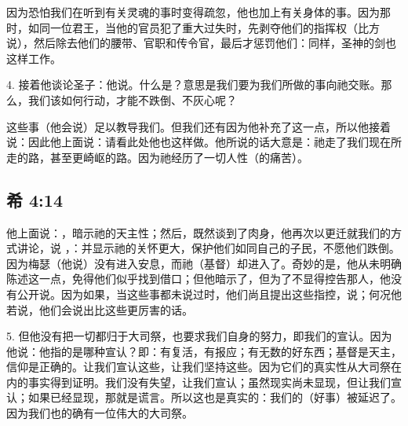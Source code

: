 因为恐怕我们在听到有关灵魂的事时变得疏忽，他也加上有关身体的事。因为那时，如同一位君王，当他的官员犯了重大过失时，先剥夺他们的指挥权（比方说），然后除去他们的腰带、官职和传令官，最后才惩罚他们：同样，圣神的剑也这样工作。\par

4. 接着他谈论圣子：他说。什么是？意思是我们要为我们所做的事向祂交账。那么，我们该如何行动，才能不跌倒、不灰心呢？\par

这些事（他会说）足以教导我们。但我们还有因为他补充了这一点，所以他接着说：因此他上面说：请看此处他也这样做。他所说的话大意是：祂走了我们现在所走的路，甚至更崎岖的路。因为祂经历了一切人性（的痛苦）。\par


\subsection{希 4:14}

他上面说：，暗示祂的天主性；然后，既然谈到了肉身，他再次以更迁就我们的方式讲论，说 ，：并显示祂的关怀更大，保护他们如同自己的子民，不愿他们跌倒。因为梅瑟（他说）没有进入安息，而祂（基督）却进入了。奇妙的是，他从未明确陈述这一点，免得他们似乎找到借口；但他暗示了，但为了不显得控告那人，他没有公开说。因为如果，当这些事都未说过时，他们尚且提出这些指控，说；何况他若说，他们会说出比这些更厉害的话。\par

5. 但他没有把一切都归于大司祭，也要求我们自身的努力，即我们的宣认。因为他说：他指的是哪种宣认？即：有复活，有报应；有无数的好东西；基督是天主，信仰是正确的。让我们宣认这些，让我们坚持这些。因为它们的真实性从大司祭在内的事实得到证明。我们没有失望，让我们宣认；虽然现实尚未显现，但让我们宣认；如果已经显现，那就是谎言。所以这也是真实的：我们的（好事）被延迟了。因为我们也的确有一位伟大的大司祭。\par


